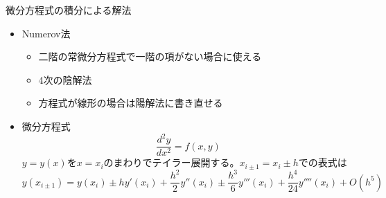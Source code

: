 \begin{frame}[t,fragile]{微分方程式の積分による解法}
  \begin{itemize}
    \setlength{\itemsep}{1em}
  \item Numerov法
    \begin{itemize}
    \item 二階の常微分方程式で一階の項がない場合に使える
    \item 4次の陰解法
    \item 方程式が線形の場合は陽解法に書き直せる
    \end{itemize}
  \item 微分方程式
    \[
    \frac{d^2y}{dx^2} = f(x,y)
    \]
  $y=y(x)$を$x=x_i$のまわりでテイラー展開する。$x_{i \pm 1} = x_i \pm h$での表式は
      \[
      y(x_{i \pm 1}) = y(x_i) \pm h y'(x_i) + \frac{h^2}{2} y''(x_i) \pm \frac{h^3}{6} y'''(x_i) + \frac{h^4}{24} y''''(x_i)  + O(h^5)
      \]
  \end{itemize}
\end{frame}
